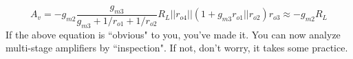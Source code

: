     \begin{equation}
        A_v = - g_{m2} \frac{g_{m3}}{g_{m3} + 1/r_{o1} + 1/r_{o2}} R_L || r_{o4} || (1 + g_{m3} r_{o1}||r_{o2}) r_{o3} \approx -g_{m2} R_L
    \end{equation} 
If the above equation is ``obvious" to you, you've made it.  You can now analyze multi-stage amplifiers by ``inspection".  If not, don't worry, it takes some practice.
%
%
%
%
% 
%
%
%
%
%
%
% 
%
% 
%
%
%
%
%

